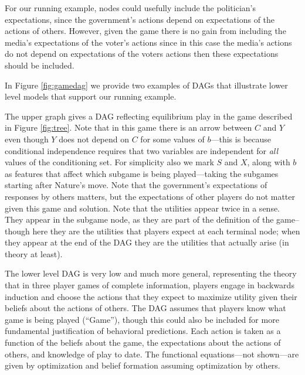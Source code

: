 \documentclass[12pt,]{book}
\begin{document}
For our running example, nodes could usefully include the politician's expectations, since the government's actions depend on expectations of the actions of others. However, given the game there is no gain from including the media's expectations of the voter's actions since in this case the media's actions do not depend on expectations of the voters actions then these expectations should be included.

In Figure \ref{fig:gamedag} we provide two examples of DAGs that illustrate lower level models that support our running example.

The upper graph gives a DAG reflecting equilibrium play in the game described in Figure \ref{fig:tree}. Note that in this game there is an arrow between \(C\) and \(Y\) even though \(Y\) does not depend on \(C\) for some values of \(b\)---this is because conditional independence requires that two variables are independent for \emph{all} values of the conditioning set. For simplicity also we mark \(S\) and \(X\), along with \(b\) as features that affect which subgame is being played---taking the subgames starting after Nature's move. Note that the government's expectations of responses by others matters, but the expectations of other players do not matter given this game and solution. Note that the utilities appear twice in a sense. They appear in the subgame node, as they are part of the definition of the game--though here they are the utilities that players expect at each terminal node; when they appear at the end of the DAG they are the utilities that actually arise (in theory at least).

The lower level DAG is very low and much more general, representing the theory that in three player games of complete information, players engage in backwards induction and choose the actions that they expect to maximize utility given their beliefs about the actions of others. The DAG assumes that players know what game is being played (``Game''), though this could also be included for more fundamental justification of behavioral predictions. Each action is taken as a function of the beliefs about the game, the expectations about the actions of others, and knowledge of play to date. The functional equations---not shown---are given by optimization and belief formation assuming optimization by others.
\end{document}
